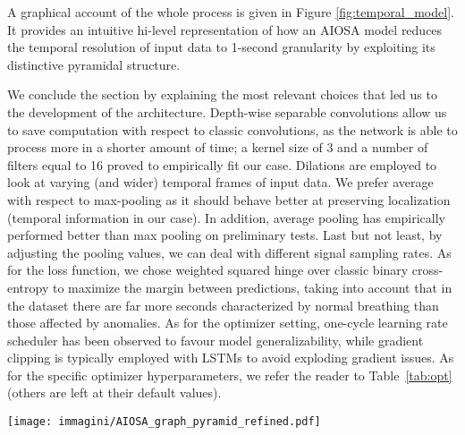 \documentclass[5p,twocolumn,lefttitle]{elsarticle}
\begin{document}
A graphical account of the whole process is given in Figure \ref{fig:temporal_model}. It provides an intuitive hi-level representation of how an AIOSA model reduces the temporal resolution of input data to 1-second granularity by exploiting its distinctive pyramidal structure.


We  conclude the section by explaining the most relevant choices that led us to the development of the architecture. Depth-wise separable convolutions allow us to save computation with respect to classic convolutions, as the network is able to process more in a shorter amount of time; a kernel size of 3 and a number of filters equal to 16 proved to empirically fit our case. Dilations are employed to look at varying (and wider) temporal frames of input data. We prefer average with respect to max-pooling as it should behave better at preserving localization (temporal information in our case).  In addition,  average pooling has empirically performed better than max pooling on preliminary tests. Last but not least, by adjusting the pooling values, we can deal with different signal sampling rates. As for the loss function, we chose weighted squared hinge over classic binary cross-entropy to maximize the margin between predictions, taking into account that in the dataset there are far more seconds characterized by normal breathing than those affected by anomalies.  As for the optimizer setting, one-cycle learning rate scheduler has been observed to favour model generalizability, while gradient clipping is typically employed with LSTMs to avoid exploding gradient issues. 
As for the specific optimizer hyperparameters, we refer the reader to Table~\ref{tab:opt} (others are left at their default values).



\begin{figure*}[tb]
    \centering
    \texttt{[image: immagini/AIOSA\_graph\_pyramid\_refined.pdf]}
    \caption{Hi-level representation of the AIOSA model showing how temporal resolution is reduced during the computation. $\mathcal{S}$ is the single window size in seconds, $\mathcal{F}$ is the sampling frequency in Hz, and $\mathcal{W}$ is the number of considered windows (3 in the example).} 
    \label{fig:temporal_model}
\end{figure*}

\begin{table}[tb]
\centering
\caption{Optimizer hyperparameters.\label{tab:opt}}
\end{table}
\end{document}
